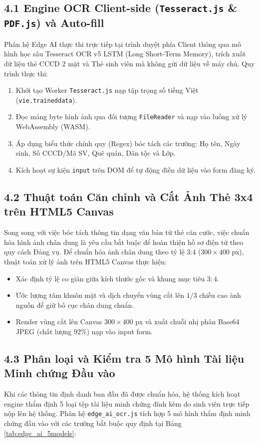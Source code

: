 \documentclass[12pt,a4paper]{report}
\begin{document}
\subsection*{4.1 Engine OCR Client-side (\texttt{Tesseract.js} \& \texttt{PDF.js}) và Auto-fill}
Phân hệ Edge AI thực thi trực tiếp tại trình duyệt phía Client thông qua mô hình học sâu Tesseract OCR v5 LSTM (Long Short-Term Memory), trích xuất dữ liệu thẻ CCCD 2 mặt và Thẻ sinh viên mà không gửi dữ liệu về máy chủ. Quy trình thực thi:
\begin{enumerate}[label=\arabic*.]
  \item Khởi tạo Worker \texttt{Tesseract.js} nạp tập trọng số tiếng Việt (\texttt{vie.traineddata}).
  \item Đọc mảng byte hình ảnh qua đối tượng \texttt{FileReader} và nạp vào luồng xử lý WebAssembly (WASM).
  \item Áp dụng biểu thức chính quy (Regex) bóc tách các trường: Họ tên, Ngày sinh, Số CCCD/Mã SV, Quê quán, Dân tộc và Lớp.
  \item Kích hoạt sự kiện \texttt{input} trên DOM để tự động điền dữ liệu vào form đăng ký.
\end{enumerate}

\subsection*{4.2 Thuật toán Căn chỉnh và Cắt Ảnh Thẻ 3x4 trên HTML5 Canvas}
Song song với việc bóc tách thông tin dạng văn bản từ thẻ căn cước, việc chuẩn hóa hình ảnh chân dung là yêu cầu bắt buộc để hoàn thiện hồ sơ điện tử theo quy cách Đảng vụ. Để chuẩn hóa ảnh chân dung theo tỷ lệ 3:4 ($300 \times 400$ px), thuật toán xử lý ảnh trên HTML5 Canvas thực hiện:
\begin{itemize}[label=--,leftmargin=*]
  \item Xác định tỷ lệ co giãn giữa kích thước gốc và khung mục tiêu $3:4$.
  \item Ước lượng tâm khuôn mặt và dịch chuyển vùng cắt lên $1/3$ chiều cao ảnh nguồn để giữ bố cục chân dung chuẩn.
  \item Render vùng cắt lên Canvas $300 \times 400$ px và xuất chuỗi nhị phân Base64 JPEG (chất lượng 92\%) nạp vào input form.
\end{itemize}

\subsection*{4.3 Phân loại và Kiểm tra 5 Mô hình Tài liệu Minh chứng Đầu vào}
Khi các thông tin định danh ban đầu đã được chuẩn hóa, hệ thống kích hoạt engine thẩm định 5 loại tệp tài liệu minh chứng đính kèm do sinh viên trực tiếp nộp lên hệ thống. Phân hệ \texttt{edge\_ai\_ocr.js} tích hợp 5 mô hình thẩm định minh chứng đầu vào với các trường bắt buộc quy định tại Bảng \ref{tab:edge_ai_5models}:
\end{document}
